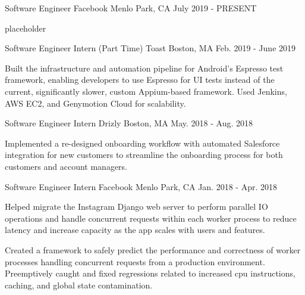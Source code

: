 
\begin{cventries}
  \cventry
  {Software Engineer} %
  {Facebook} %
  {Menlo Park, CA} %
  {July 2019 - PRESENT} %
  {
    \begin{cvitems} %
      \item {placeholder}
    \end{cvitems}
  }

  \cventry
  {Software Engineer Intern (Part Time)} %
  {Toast} %
  {Boston, MA} %
  {Feb. 2019 - June 2019} %
  {
    \begin{cvitems} %
      \item {Built the infrastructure and automation pipeline for Android's Espresso test framework, enabling developers to use Espresso for UI tests instead of the current, significantly slower, custom Appium-based framework. Used Jenkins, AWS EC2, and Genymotion Cloud for scalability.}
    \end{cvitems}
  }

  \cventry
  {Software Engineer Intern} %
  {Drizly} %
  {Boston, MA} %
  {May. 2018 - Aug. 2018} %
  {
    \begin{cvitems} %
      \item {Implemented a re-designed onboarding workflow with automated Salesforce integration for new customers to streamline the onboarding process for both customers and account managers.}
    \end{cvitems}
  }

  \cventry
  {Software Engineer Intern} %
  {Facebook} %
  {Menlo Park, CA} %
  {Jan. 2018 - Apr. 2018} %
  {
    \begin{cvitems} %
      \item {Helped migrate the Instagram Django web server to perform parallel IO operations and handle concurrent requests within each worker process to reduce latency and increase capacity as the app scales with users and features.}
      \item {Created a framework to safely predict the performance and correctness of worker processes handling concurrent requests from a production environment. Preemptively caught and fixed regressions related to increased cpu instructions, caching, and global state contamination.}
    \end{cvitems}
  }


\end{cventries}
